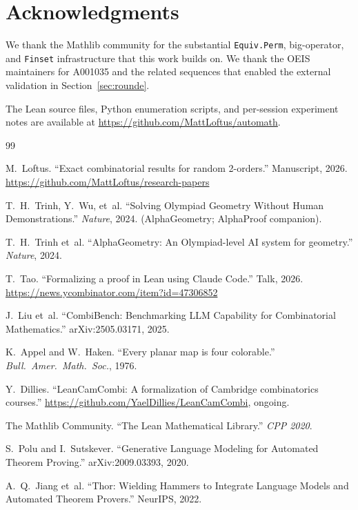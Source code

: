 \documentclass[11pt]{article}
\theoremstyle{definition}
\begin{document}
\section*{Acknowledgments}

We thank the Mathlib community for the substantial \texttt{Equiv.Perm},
big-operator, and \texttt{Finset} infrastructure that this work builds on. We
thank the OEIS maintainers for A001035 and the related sequences that enabled
the external validation in Section~\ref{sec:rounde}.

The Lean source files, Python enumeration scripts, and per-session experiment
notes are available at
\url{https://github.com/MattLoftus/automath}.

\begin{thebibliography}{99}

M.~Loftus.
``Exact combinatorial results for random 2-orders.''
Manuscript, 2026.
\url{https://github.com/MattLoftus/research-papers}

T.~H.~Trinh, Y.~Wu, et~al.
``Solving Olympiad Geometry Without Human Demonstrations.''
\emph{Nature}, 2024.
(AlphaGeometry; AlphaProof companion).

T.~H.~Trinh et~al.
``AlphaGeometry: An Olympiad-level AI system for geometry.''
\emph{Nature}, 2024.

T.~Tao.
``Formalizing a proof in Lean using Claude Code.''
Talk, 2026.
\url{https://news.ycombinator.com/item?id=47306852}

J.~Liu et~al.
``CombiBench: Benchmarking LLM Capability for Combinatorial Mathematics.''
arXiv:2505.03171, 2025.

K.~Appel and W.~Haken.
``Every planar map is four colorable.''
\emph{Bull.\ Amer.\ Math.\ Soc.}, 1976.

Y.~Dillies.
``LeanCamCombi: A formalization of Cambridge combinatorics courses.''
\url{https://github.com/YaelDillies/LeanCamCombi}, ongoing.

The Mathlib Community.
``The Lean Mathematical Library.''
\emph{CPP 2020}.

S.~Polu and I.~Sutskever.
``Generative Language Modeling for Automated Theorem Proving.''
arXiv:2009.03393, 2020.

A.~Q.~Jiang et~al.
``Thor: Wielding Hammers to Integrate Language Models and Automated Theorem Provers.''
NeurIPS, 2022.


\end{thebibliography}
\end{document}
